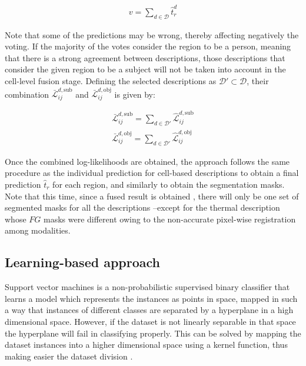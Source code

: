 \documentclass[10pt,twocolumn,letterpaper]{article}
\begin{document}
\begin{gather}
v = \sum_{d \in \mathcal{D}} \hat{t}_{r}^{d}
\end{gather}
 
Note that some of the predictions may be wrong, thereby affecting negatively the voting. If the majority of the votes consider the region to be a person, meaning that there is a strong agreement between descriptions, those descriptions that consider the given region to be a subject will not be taken into account in the cell-level fusion stage. Defining the selected descriptions as $\mathcal{D}' \subset \mathcal{D}$, their combination $\bar{\mathcal{L}}_{ij}^{d,\mathrm{sub}}$ and $\bar{\mathcal{L}}_{ij}^{d,\mathrm{obj}}$ is given by:

\begin{gather}
\bar{\mathcal{L}}_{ij}^{d,\mathrm{sub}} = \sum_{d \in \mathcal{D}'} \hat{\mathcal{L}}_{ij}^{d,\mathrm{sub}}\\[2ex]
\bar{\mathcal{L}}_{ij}^{d,\mathrm{obj}} = \sum_{d \in \mathcal{D}'} \hat{\mathcal{L}}_{ij}^{d,\mathrm{obj}}  
\end{gather}
 
Once the combined log-likelihoods are obtained, the approach follows the same procedure as the individual prediction for cell-based descriptions to obtain a final prediction $\hat{t}_r$ for each region, and similarly to obtain the segmentation masks. Note that this time, since a fused result is obtained , there will only be one set of segmented masks for all the descriptions --except for the thermal description whose $FG$ masks were different owing to the non-accurate pixel-wise registration among modalities.

\subsection{Learning-based approach}
Support vector machines is a non-probabilistic supervised binary classifier that learns a model which represents the instances as points in space, mapped in such a way that instances of different classes are separated by a hyperplane in a high dimensional space. However, if the dataset is not linearly separable in that space the hyperplane will fail in classifying properly. This can be solved by mapping the dataset instances into a higher dimensional space using a kernel function, thus making easier the dataset division \cite{hearst1998support}. 
\end{document}
